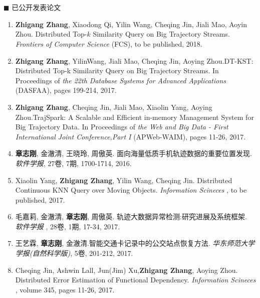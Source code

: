 \chapter*{}
{\heiti $\blacksquare$ 已公开发表论文}
	\vskip 5mm

\begin{enumerate}
	\renewcommand{\labelenumi}{[\theenumi]}
	\renewcommand\baselinestretch{1}\selectfont 	
	
	\item  \textbf{Zhigang Zhang}, Xiaodong Qi, Yilin Wang, Cheqing Jin, Jiali Mao, Aoyin Zhou. Distributed Top-$k$ Similarity Query on Big Trajectory Streams. \textit{Frontiers of Computer Science} (FCS), to be published, 2018.
	
	\item \textbf{Zhigang Zhang}, YilinWang, Jiali Mao, Cheqing Jin, Aoying Zhou.DT-KST: Distributed Top-k Similarity Query on Big
Trajectory Streams. In Proceedings of \textit{the 22th Database Systems for Advanced Applications} (DASFAA), pages 199-214, 2017.
	
	\item \textbf{Zhigang Zhang}, Cheqing Jin, Jiali Mao, Xiaolin Yang, Aoying Zhou.TrajSpark: A Scalable and Efficient in-memory
Management System for Big Trajectory Data. In Proceedings of \textit{the Web and Big Data - First International Joint Conference,Part {I}} (APWeb-WAIM), pages 11-26, 2017.
	
	\item \textbf{章志刚}, 金澈清, 王晓玲, 周傲英. 面向海量低质手机轨迹数据的重要位置发现.  \textit{软件学报},
	27卷, 7期, 1700-1714, 2016.
	
	\item  Xiaolin Yang, \textbf{Zhigang Zhang},  Yilin Wang, Cheqing Jin. Distributed Continuous KNN Query over Moving Objects. \textit{Information Scineces} , to be published, 2017.
	
	
	\item 毛嘉莉, 金澈清, \textbf{章志刚}, 周傲英. 轨迹大数据异常检测:研究进展及系统框架. \textit{软件学报} , 28卷, 1期, 17-34, 2017.
	
	\item 王艺霖, \textbf{章志刚}, 金澈清.智能交通卡记录中的公交站点恢复方法.  \textit{华东师范大学学报(自然科学版)}, 5卷, 201-212, 2017.
	
	\item  Cheqing Jin, Ashwin Lall, Jun(Jim) Xu,\textbf{Zhigang Zhang},  Aoying Zhou. Distributed Error Estimation of Functional Dependency. \textit{Information Scineces} , volume 345, pages 11-26, 2017.
	

\end{enumerate}
